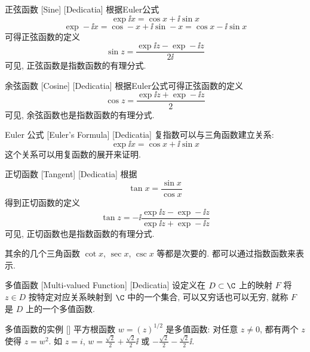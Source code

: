 \documentclass[UTF8]{ctexart}
\begin{document}
        \begin{dfn}
            [UUID]
            {正弦函数}
            [Sine]
            [Dedicatia]
            根据Euler公式
            \[\exp \ii x=\cos x+\ii\sin x\]
            \[\exp -\ii x=\cos -x+\ii\sin -x=\cos x-\ii\sin x\]
            可得正弦函数的定义
            \[\sin z=\frac{\exp\ii z-\exp -\ii z}{2\ii}\]
            可见, 正弦函数是指数函数的有理分式. 
        \end{dfn}

        \begin{dfn}
            [UUID]
            {余弦函数}
            [Cosine]
            [Dedicatia]
            根据Euler公式可得正弦函数的定义
            \[\cos z=\frac{\exp\ii z+\exp -\ii z}{2}\]
            可见, 余弦函数也是指数函数的有理分式. 
        \end{dfn}

        \begin{thm}
            [UUID]
            {Euler 公式}
            [Euler's Formula]
            [Dedicatia]
            复指数可以与三角函数建立关系: 
            \[\exp \ii x=\cos x+\ii\sin x\]
            这个关系可以用复函数的\PowerSeries 展开来证明. 
        \end{thm}

        \begin{dfn}
            [UUID]
            {正切函数}
            [Tangent]
            [Dedicatia]
            根据
            \[\tan x=\frac{\sin x}{\cos x}\]
            得到正切函数的定义
            \[\tan z=-\ii\frac{\exp \ii z-\exp -\ii z}{\exp \ii z+\exp -\ii z}\]
            可见, 正切函数也是指数函数的有理分式. 
        \end{dfn}

        其余的几个三角函数 \(\cot x\),  \(\sec x\),  \(\csc x\) 等都是次要的. 都可以通过指数函数来表示. 

        \begin{dfn}
            [Multivalued]
            {多值函数}
            [Multi-valued Function]
            [Dedicatia]
            设定义在 \(D\subset\C\) 上的映射 \(F\) 将 \(z\in D\) 按特定对应关系映射到 \(\C\) 中的一个集合, 可以又穷话也可以无穷, 就称 \(F\) 是 \(D\) 上的一个多值函数. 
        \end{dfn}

        \begin{xmp}
            {多值函数的实例}
            []
            平方根函数 \(w=(z)^{1/2}\) 是多值函数: 对任意 \(z\neq 0\), 都有两个 \(z\) 使得 \(z=w^2\). 如 \(z=i\),  \(w=\frac{\sqrt{2}}{2}+\frac{\sqrt{2}}{2}\ii\) 或 \(-\frac{\sqrt{2}}{2}-\frac{\sqrt{2}}{2}\ii\).
        \end{xmp}
\end{document}
